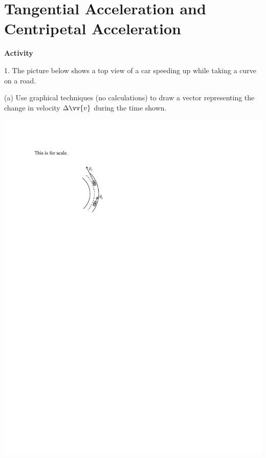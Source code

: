 \section{Tangential Acceleration and Centripetal Acceleration}

\makelabheader %

\textbf{Activity}

1. The picture below shows a top view of a car speeding up while taking a curve on a road. 

(a)  Use graphical techniques (no calculations) to draw a vector representing the change in velocity $\Delta \vv{v}$ during the time shown.

\hspace{1.0in}\includegraphics{tangential_and_centripetal_acc/curve1.pdf}

